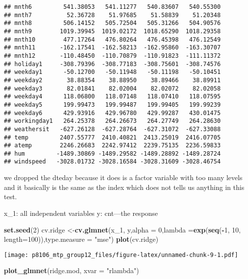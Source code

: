 \documentclass[]{article}
\newenvironment{Shaded}{\begin{snugshade}}{\end{snugshade}}
\newcommand{\KeywordTok}[1]{\textcolor[rgb]{0.13,0.29,0.53}{\textbf{#1}}}
\newcommand{\DataTypeTok}[1]{\textcolor[rgb]{0.13,0.29,0.53}{#1}}
\newcommand{\DecValTok}[1]{\textcolor[rgb]{0.00,0.00,0.81}{#1}}
\newcommand{\StringTok}[1]{\textcolor[rgb]{0.31,0.60,0.02}{#1}}
\newcommand{\OperatorTok}[1]{\textcolor[rgb]{0.81,0.36,0.00}{\textbf{#1}}}
\newcommand{\NormalTok}[1]{#1}
\begin{document}
\begin{verbatim}
## mnth6         541.38053   541.11277   540.83607   540.55300
## mnth7          52.36728    51.97685    51.58839    51.20348
## mnth8         506.14152   505.72504   505.31266   504.90576
## mnth9        1019.39945  1019.02172  1018.65290  1018.29358
## mnth10        477.17264   476.80264   476.45398   476.12549
## mnth11       -162.17541  -162.58213  -162.95860  -163.30707
## mnth12       -110.48450  -110.70879  -110.91823  -111.11372
## holiday1     -308.79396  -308.77183  -308.75601  -308.74576
## weekday1      -50.12700   -50.11948   -50.11198   -50.10451
## weekday2       38.88354    38.88950    38.89466    38.89911
## weekday3       82.01841    82.02004    82.02072    82.02058
## weekday4      118.06800   118.07148   118.07410   118.07595
## weekday5      199.99473   199.99487   199.99405   199.99239
## weekday6      429.93916   429.96780   429.99287   430.01475
## workingday1   264.25378   264.26673   264.27749   264.28630
## weathersit   -627.26128  -627.28764  -627.31072  -627.33088
## temp         2407.55777  2410.40821  2413.25019  2416.07705
## atemp        2246.26683  2242.97412  2239.75135  2236.59833
## hum         -1489.30869 -1489.29582 -1489.28892 -1489.28724
## windspeed   -3028.01732 -3028.16584 -3028.31609 -3028.46754
\end{verbatim}

we dropped the dteday because it does is a factor variable with too many
levels and it basically is the same as the index which does not tells us
anything in this test.

x\_1: all independent variables y: cnt---the response

\begin{Shaded}
\begin{Highlighting}[]
\KeywordTok{set.seed}\NormalTok{(}\DecValTok{2}\NormalTok{)}
\NormalTok{cv.ridge <-}\KeywordTok{cv.glmnet}\NormalTok{(x_}\DecValTok{1}\NormalTok{, y,}\DataTypeTok{alpha =} \DecValTok{0}\NormalTok{,}\DataTypeTok{lambda =}\KeywordTok{exp}\NormalTok{(}\KeywordTok{seq}\NormalTok{(}\OperatorTok{-}\DecValTok{1}\NormalTok{, }\DecValTok{10}\NormalTok{, }\DataTypeTok{length=}\DecValTok{100}\NormalTok{)),}\DataTypeTok{type.measure =} \StringTok{"mse"}\NormalTok{)}
\KeywordTok{plot}\NormalTok{(cv.ridge)}
\end{Highlighting}
\end{Shaded}

\texttt{[image: p8106\_mtp\_group12\_files/figure-latex/unnamed-chunk-9-1.pdf]}

\begin{Shaded}
\begin{Highlighting}[]
\KeywordTok{plot_glmnet}\NormalTok{(ridge.mod, }\DataTypeTok{xvar =} \StringTok{"rlambda"}\NormalTok{)}
\end{Highlighting}
\end{Shaded}
\end{document}
